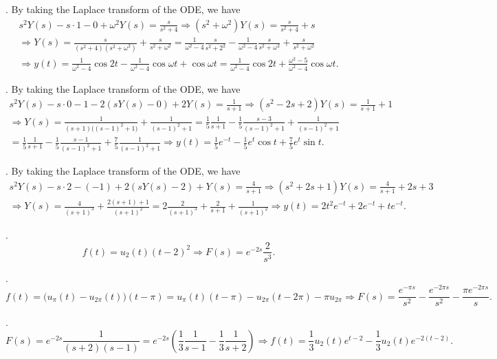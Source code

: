 \documentclass[12 pt letterpaper]{article}
\newcommand{\LA}{\Longrightarrow}
\begin{document}
. By taking the Laplace transform of the ODE, we have
\begin{gather*} s^2 Y(s) -s \cdot 1 - 0  + \omega^2 Y(s) = \frac{s}{s^2+4}
\LA  (s^2 +\omega^2) Y(s) = \frac{s}{s^2+4} +s \\
\LA Y(s) = \frac{s}{(s^2+4)(s^2 +\omega^2)} + \frac{s}{s^2 +\omega^2}
= \frac{1}{\omega^2 - 4} \frac{s}{s^2+2^2} - \frac{1}{\omega^2 - 4} \frac{s}{s^2+\omega^2}
+ \frac{s}{s^2 +\omega^2} \\
\LA y(t) = \frac{1}{\omega^2 - 4} \cos 2t - \frac{1}{\omega^2 - 4} \cos \omega t
+ \cos \omega t
= \frac{1}{\omega^2 - 4} \cos 2t + \frac{\omega^2 - 5}{\omega^2 - 4} \cos \omega t.
\end{gather*}

. By taking the Laplace transform of the ODE, we have
\begin{gather*} s^2 Y(s) -s \cdot 0 - 1 -2(sY(s) - 0) + 2Y(s) = \frac{1}{s+1}
\LA (s^2 -2s +2) Y(s) = \frac{1}{s+1} +1 \\
\LA Y(s) = \frac{1}{(s+1)\big( (s-1)^2 + 1\big)} + \frac{1}{(s-1)^2+1} 
= \frac{1}{5}\frac{1}{s+1} -\frac{1}{5} \frac{s-3}{(s-1)^2 + 1} + \frac{1}{(s-1)^2+1}\\
= \frac{1}{5}\frac{1}{s+1} -\frac{1}{5} \frac{s-1}{(s-1)^2 + 1} + \frac{7}{5}\frac{1}{(s-1)^2+1}
\LA y(t) = \frac{1}{5} e^{-t} - \frac{1}{5} e^t \cos t + \frac{7}{5} e^t \sin t.
\end{gather*}

. By taking the Laplace transform of the ODE, we have
\begin{gather*} s^2 Y(s) -s \cdot 2 -(- 1) + 2(sY(s) - 2) + Y(s) = \frac{4}{s+1}
\LA (s^2 + 2s + 1) Y(s) = \frac{4}{s+1} + 2s + 3\\
\LA Y(s) = \frac{4}{(s+1)^3} + \frac{2(s+1) + 1}{(s+1)^2}
= 2 \frac{2 \! }{(s+1)^3} + \frac{2}{s+1} + \frac{1}{(s+1)^2}
\LA y(t) = 2 t^2 e^{-t} + 2 e^{-t} + t e^{-t}.
\end{gather*}

\vspace{2mm}


. \[f(t) = u_2(t)(t-2)^2  \LA F(s) = e^{-2s} \frac{2}{s^3}.\]

. \[f(t) = \big(u_\pi (t) - u_{2\pi}(t) \big) (t- \pi)
= u_\pi(t) (t- \pi) - u_{2\pi}(t - 2 \pi) - \pi u_{2\pi}
\LA F(s) = \frac{e^{-\pi s}}{s^2} - \frac{e^{-2\pi s}}{s^2} - \frac{\pi e^{-2\pi s}}{s}.\]

.
\[F(s) = e^{-2s}\frac{1}{(s+2)(s - 1)} 
= e^{-2s} \left( \frac{1}{3} \frac {1}{s- 1} - \frac{1}{3} \frac{1}{s+2} \right)
\LA f(t) = \frac{1}{3}u_2(t) e^{t- 2} - \frac{1}{3} u_2(t) e^{-2(t-2)} .
\]
\end{document}
